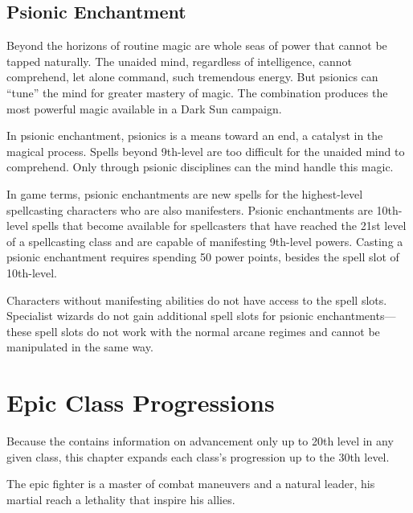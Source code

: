 

\subsection{Psionic Enchantment}
Beyond the horizons of routine magic are whole seas of power that cannot be tapped naturally. The unaided mind, regardless of intelligence, cannot comprehend, let alone command, such tremendous energy. But psionics can ``tune'' the mind for greater mastery of magic. The combination produces the most powerful magic available in a {\tableheader Dark Sun} campaign.

In psionic enchantment, psionics is a means toward an end, a catalyst in the magical process. Spells beyond 9th-level are too difficult for the unaided mind to comprehend. Only through psionic disciplines can the mind handle this magic.

In game terms, psionic enchantments are new spells for the highest-level spellcasting characters who are also manifesters. Psionic enchantments are 10th-level spells that become available for spellcasters that have reached the 21st level of a spellcasting class and are capable of manifesting 9th-level powers. Casting a psionic enchantment requires spending 50 power points, besides the spell slot of 10th-level.

Characters without manifesting abilities do not have access to the spell slots. Specialist wizards do not gain additional spell slots for psionic enchantments---these spell slots do not work with the normal arcane regimes and cannot be manipulated in the same way.

\section{Epic Class Progressions}
Because the  contains information on advancement only up to 20th level in any given class, this chapter expands each class's progression up to the 30th level.







The epic fighter is a master of combat maneuvers and a natural leader, his martial reach a lethality that inspire his allies.

